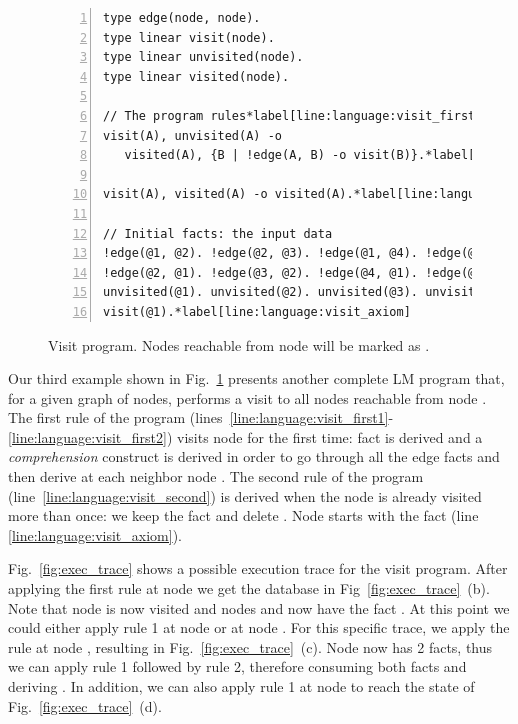 
\begin{figure}[h!]
\begin{Verbatim}[numbers=left,fontsize=\codesize,commandchars=\*\[\]]
type edge(node, node).
type linear visit(node).
type linear unvisited(node).
type linear visited(node).

// The program rules*label[line:language:visit_first1]
visit(A), unvisited(A) -o
   visited(A), {B | !edge(A, B) -o visit(B)}.*label[line:language:visit_first2]*label[line:language:visit_comprehension]

visit(A), visited(A) -o visited(A).*label[line:language:visit_second]

// Initial facts: the input data
!edge(@1, @2). !edge(@2, @3). !edge(@1, @4). !edge(@2, @4).
!edge(@2, @1). !edge(@3, @2). !edge(@4, @1). !edge(@4, @2).
unvisited(@1). unvisited(@2). unvisited(@3). unvisited(@4).
visit(@1).*label[line:language:visit_axiom]
\end{Verbatim}
  \caption{Visit program. Nodes reachable from node  will be marked
     as .}
  \label{code:language:visit}
\end{figure}

Our third example shown in Fig.~\ref{code:language:visit} presents another
complete LM program that, for a given graph of nodes, performs a visit to all
nodes reachable from node . The first rule of the program
(lines~\ref{line:language:visit_first1}-\ref{line:language:visit_first2}) visits
node  for the first time: fact  is derived and a
\emph{comprehension} construct is derived in order to go through all the edge
facts and then derive  at each neighbor node . The second
rule of the program (line~\ref{line:language:visit_second}) is derived when the
node is already visited more than once: we keep the  fact and
delete . Node  starts with the  fact (line
\ref{line:language:visit_axiom}).

Fig.~\ref{fig:exec_trace} shows a possible execution trace for the visit
program. After applying the first rule at node  we get the database in
Fig~\ref{fig:exec_trace}~(b).  Note that node  is now visited and nodes
 and  now have the fact . At this point we could
either apply rule 1 at node  or at node .  For this specific
trace, we apply the rule at node , resulting in
Fig.~\ref{fig:exec_trace}~(c). Node  now has 2  facts, thus
we can apply rule 1 followed by rule 2, therefore consuming both 
facts and deriving . In addition, we can also apply rule 1 at node
 to reach the state of Fig.~\ref{fig:exec_trace}~(d).

